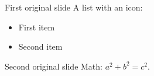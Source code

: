 \documentclass{beamer}
\begin{document}
\begin{frame}{First original slide}
A list with an icon: \begin{itemize}\item First item\item Second item\end{itemize}
\end{frame}
\begin{frame}{Second original slide}
Math: $a^2+b^2=c^2$.
\end{frame}
\end{document}

